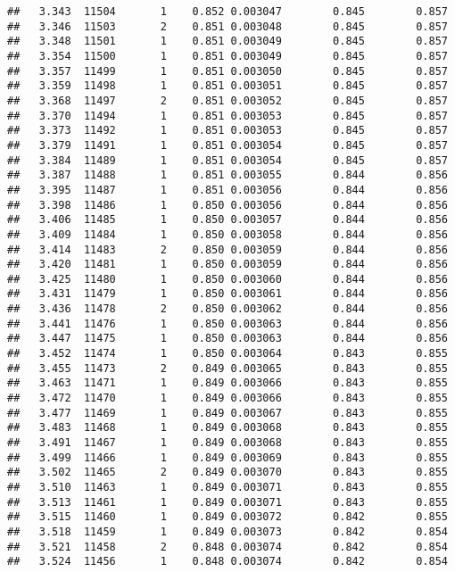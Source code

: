 \documentclass[
]{book}
\begin{document}
\begin{verbatim}
##   3.343  11504       1    0.852 0.003047        0.845        0.857
##   3.346  11503       2    0.851 0.003048        0.845        0.857
##   3.348  11501       1    0.851 0.003049        0.845        0.857
##   3.354  11500       1    0.851 0.003049        0.845        0.857
##   3.357  11499       1    0.851 0.003050        0.845        0.857
##   3.359  11498       1    0.851 0.003051        0.845        0.857
##   3.368  11497       2    0.851 0.003052        0.845        0.857
##   3.370  11494       1    0.851 0.003053        0.845        0.857
##   3.373  11492       1    0.851 0.003053        0.845        0.857
##   3.379  11491       1    0.851 0.003054        0.845        0.857
##   3.384  11489       1    0.851 0.003054        0.845        0.857
##   3.387  11488       1    0.851 0.003055        0.844        0.856
##   3.395  11487       1    0.851 0.003056        0.844        0.856
##   3.398  11486       1    0.850 0.003056        0.844        0.856
##   3.406  11485       1    0.850 0.003057        0.844        0.856
##   3.409  11484       1    0.850 0.003058        0.844        0.856
##   3.414  11483       2    0.850 0.003059        0.844        0.856
##   3.420  11481       1    0.850 0.003059        0.844        0.856
##   3.425  11480       1    0.850 0.003060        0.844        0.856
##   3.431  11479       1    0.850 0.003061        0.844        0.856
##   3.436  11478       2    0.850 0.003062        0.844        0.856
##   3.441  11476       1    0.850 0.003063        0.844        0.856
##   3.447  11475       1    0.850 0.003063        0.844        0.856
##   3.452  11474       1    0.850 0.003064        0.843        0.855
##   3.455  11473       2    0.849 0.003065        0.843        0.855
##   3.463  11471       1    0.849 0.003066        0.843        0.855
##   3.472  11470       1    0.849 0.003066        0.843        0.855
##   3.477  11469       1    0.849 0.003067        0.843        0.855
##   3.483  11468       1    0.849 0.003068        0.843        0.855
##   3.491  11467       1    0.849 0.003068        0.843        0.855
##   3.499  11466       1    0.849 0.003069        0.843        0.855
##   3.502  11465       2    0.849 0.003070        0.843        0.855
##   3.510  11463       1    0.849 0.003071        0.843        0.855
##   3.513  11461       1    0.849 0.003071        0.843        0.855
##   3.515  11460       1    0.849 0.003072        0.842        0.855
##   3.518  11459       1    0.849 0.003073        0.842        0.854
##   3.521  11458       2    0.848 0.003074        0.842        0.854
##   3.524  11456       1    0.848 0.003074        0.842        0.854

\end{verbatim}
\end{document}

